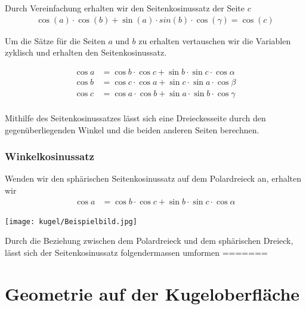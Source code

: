 \begin{refsection}
Durch Vereinfachung erhalten wir den Seitenkosinussatz der Seite $c$
\begin{align*}
\cos(a) \cdot \cos(b) + \sin(a) \cdot sin(b) \cdot \cos(\gamma) = \cos(c)
\end{align*}

Um die Sätze für die Seiten $a$ und $b$ zu erhalten vertauschen wir die Variablen zyklisch und erhalten den Seitenkosinussatz.

\begin{satz}
\label{skript:kugel:satz:Seitenkosinussatz}
\end{satz}

\begin{align*}
{\cos a} &= {\cos b} \cdot {\cos c} + {\sin b} \cdot {\sin c} \cdot {\cos \alpha}\\
{\cos b} &= {\cos c} \cdot {\cos a} + {\sin c} \cdot {\sin a} \cdot {\cos \beta}\\
{\cos c} &= {\cos a} \cdot {\cos b} + {\sin a} \cdot {\sin b} \cdot {\cos \gamma}\\
\end{align*}

Mithilfe des Seitenkosinussatzes lässt sich eine Dreieckesseite durch den gegenüberliegenden Winkel und die beiden anderen Seiten berechnen.



\subsection{Winkelkosinussatz}

Wenden wir den sphärischen Seitenkosinussatz auf dem Polardreieck an, erhalten wir
\begin{align*}
{\cos a} &= {\cos b} \cdot {\cos c} + {\sin b} \cdot {\sin c} \cdot {\cos \alpha}
\end{align*}

\begin{center}
        \texttt{[image: kugel/Beispielbild.jpg]}
\end{center}

Durch die Beziehung zwischen dem Polardreieck und dem sphärischen Dreieck, lässt sich der Seitenkosinussatz folgendermassen umformen
=======
\chapter{Geometrie auf der Kugeloberfläche\label{chapter:kugel}}
\begin{refsection}


\end{refsection}
\end{refsection}
